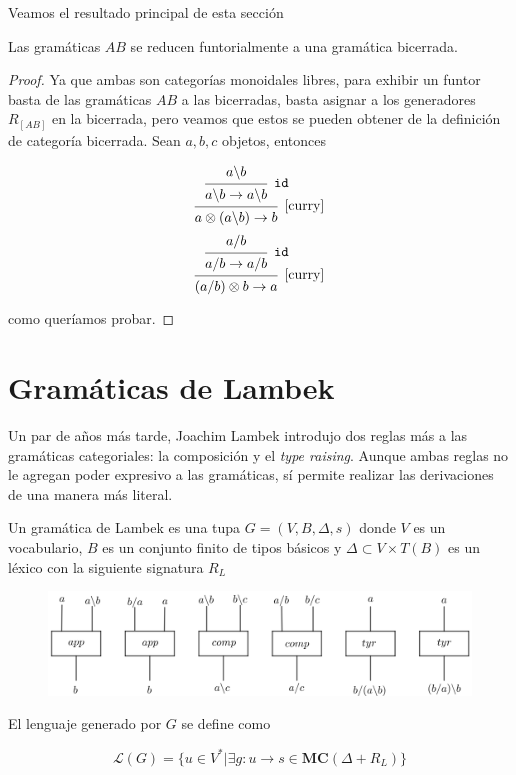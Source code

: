 \documentclass[../main.tex]{subfiles}
\begin{document}
	Veamos el resultado principal de esta sección
	
	\begin{prop}
		Las gramáticas $AB$ se reducen funtorialmente a una gramática bicerrada.
	\end{prop}
	\begin{proof}
		Ya que ambas son categorías monoidales libres, para exhibir un funtor basta de las gramáticas $AB$ a las bicerradas, basta asignar a los generadores $R_[AB]$ en la bicerrada, pero veamos que estos se pueden obtener de la definición de categoría bicerrada. Sean $a,b,c$ objetos, entonces
		\begin{multicols}{2}
			\[
			\begin{prooftree}
				\hypo{a\backslash b}
				\infer1[\tt{id}]{a\backslash b \to a\backslash b}
				\infer1[\ref{curry}]{a \otimes (a \backslash b) \to b}
			\end{prooftree}
			\]
			\[
			\begin{prooftree}
				\hypo{a/b}
				\infer1[\tt{id}]{a/b \to a/b}
				\infer1[\ref{curry}]{(a/b)\otimes b \to a}
			\end{prooftree}
			\]
		\end{multicols}
		como queríamos probar. 
	\end{proof}
	  
	\section{Gramáticas de Lambek} 
	
	Un par de años más tarde, Joachim Lambek introdujo dos reglas más a las gramáticas categoriales: la composición y el \textit{type raising}. Aunque ambas reglas no le agregan poder expresivo a las gramáticas, sí permite realizar las derivaciones de una manera más literal. 
	
	\begin{dfn}
		Un gramática de Lambek es una tupa $G=(V,B, \Delta, s)$ donde $V$ es un vocabulario, $B$ es un conjunto finito de tipos básicos y $\Delta \subset V \times T(B)$ es un léxico con la siguiente signatura $R_L$
		
		\begin{figure}[H]
			\includegraphics[scale=18]{diagrama/lambek.png}
			\centering
		\end{figure}
		El lenguaje generado por $G$ se define como
		
		$$\mathcal{L}(G)= \{ u \in V^*|\exists g:u \to s \in \textbf{MC}(\Delta + R_{L}) \}$$
		
	\end{dfn}
	
\end{document}

